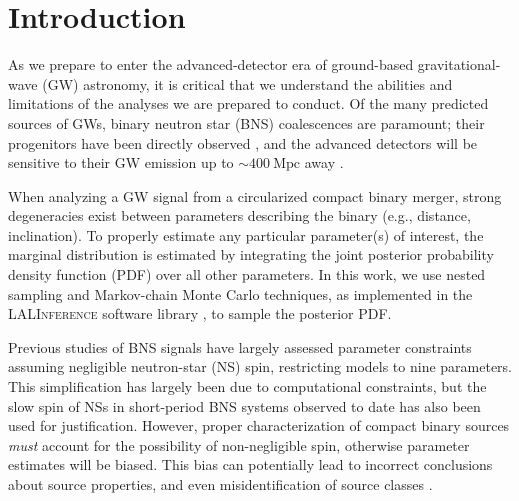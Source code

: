 \section{Introduction}

As we prepare to enter the advanced-detector era of ground-based gravitational-wave (GW) astronomy, it is critical that we understand the abilities and limitations of the analyses we are prepared to conduct. Of the many predicted sources of GWs, binary neutron star (BNS) coalescences are paramount; their progenitors have been directly observed \cite{Lorimer_2008}, and the advanced detectors will be sensitive to their GW emission up to $\sim 400~\mathrm{Mpc}$ away \citep{2013arXiv1304.0670L}.

When analyzing a GW signal from a circularized compact binary merger, strong degeneracies exist between parameters describing the binary (e.g., distance, inclination). To properly estimate any particular parameter(s) of interest, the marginal distribution is estimated by integrating the joint posterior probability density function (PDF) over all other parameters. In this work, we use nested sampling \citep{Veitch_2010} and Markov-chain Monte Carlo \citep{Christensen_2003,R_ver_2006,van_der_Sluys_2008} techniques, as implemented in the \textsc{LALInference} software library \cite{Veitch_2015}, to sample the posterior PDF.

Previous studies of BNS signals have largely assessed parameter constraints assuming negligible neutron-star (NS) spin, restricting models to nine parameters. This simplification has largely been due to computational constraints, but the slow spin of NSs in short-period BNS systems observed to date \citep[e.g.,][]{Mandel_2010} has also been used for justification. However, proper characterization of compact binary sources \emph{must} account for the possibility of non-negligible spin, otherwise parameter estimates will be biased.  This bias can potentially lead to incorrect conclusions about source properties, and even misidentification of source classes \citep{Buonanno_2009,Berry_2014}.

